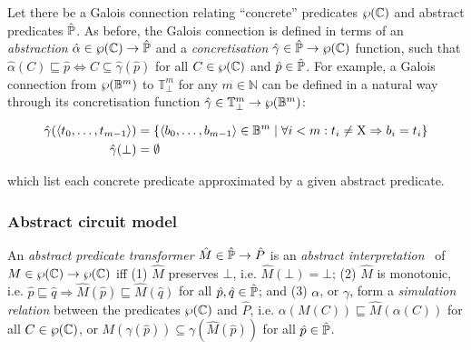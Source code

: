 Let there be a Galois connection relating ``concrete'' predicates $\wp(\mathbb{C})$ and abstract predicates $\hat{\mathbb{P}}$. As before, the Galois connection is defined in terms of an \textit{abstraction} $\hat \alpha \in \wp(\mathbb{C}) \rightarrow \hat{\mathbb{P}}$ and a \textit{concretisation} $\hat \gamma \in \hat{\mathbb{P}} \rightarrow \wp(\mathbb{C})$ function, such that $\hat \alpha(C) \sqsubseteq \hat p \iff C \subseteq \hat \gamma(\hat p)$ for all $C \in \wp(\mathbb{C})$ and $\hat p \in \hat{\mathbb{P}}$. For example, a Galois connection from $\wp(\mathbb{B}^{m})$ to $\mathbb{T}_{\bot}^{m}$ for any $m \in \mathbb{N}$ can be defined in a natural way through its concretisation function $\hat \gamma \in \mathbb{T}_{\bot}^{m} \rightarrow \wp(\mathbb{B}^{m})$:

\begin{align*}
\hat \gamma ( \langle t_{0}, \dots,t_{m-1} \rangle ) &= \{ \langle b_{0}, \dots,b_{m-1} \rangle \in \mathbb{B}^{m} \mid \forall i < m : t_{i} \neq \mathrm{X} \Rightarrow b_{i} = t_{i} \} \\
\hat \gamma ( \bot ) &= \emptyset
\end{align*}

\noindent which list each concrete predicate approximated by a given abstract predicate.



\subsubsection{Abstract circuit model} \label{sec:lat-ste-model}

An \textit{abstract predicate transformer} $\hat M \in \hat{\mathbb{P}} \rightarrow \hat P$ is an \textit{abstract interpretation}~\cite{chou1999,cousot1996} of $M \in \wp(\mathbb{C}) \rightarrow \wp(\mathbb{C})$ iff (1) $\hat M$ preserves $\bot$, i.e. $\hat M(\bot) = \bot$; (2) $\hat M$ is monotonic, i.e. $\hat p \sqsubseteq \hat q \Rightarrow \hat M (\hat p) \sqsubseteq \hat M (\hat q)$ for all $\hat p, \hat q \in \hat{\mathbb{P}}$; and (3) $\alpha$, or $\gamma$, form a \textit{simulation relation} between the predicates $\wp(\mathbb{C})$ and $\hat P$, i.e. $\alpha(M(C)) \sqsubseteq \hat M(\alpha(C))$ for all $C \in \wp(\mathbb{C})$, or $M(\gamma(\hat p)) \subseteq \gamma(\hat M(\hat p))$ for all $\hat p \in \hat{\mathbb{P}}$.


